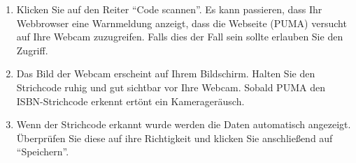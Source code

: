 \documentclass[b5paper,11pt,twoside]{scrbook} %
\begin{document}
\begin{enumerate}
\begin{itemize}
        \begin{enumerate}
            \item Klicken Sie auf den Reiter \enquote{Code scannen}. Es kann passieren, dass Ihr Webbrowser eine Warnmeldung anzeigt, dass die Webseite (PUMA) versucht auf Ihre Webcam zuzugreifen. Falls dies der Fall sein sollte erlauben Sie den Zugriff.
            \item Das Bild der Webcam erscheint auf Ihrem Bildschirm. Halten Sie den Strichcode ruhig und gut sichtbar vor Ihre Webcam. Sobald PUMA den ISBN-Strichcode erkennt ertönt ein Kamerageräusch.
            \item Wenn der Strichcode erkannt wurde werden die Daten automatisch angezeigt. Überprüfen Sie diese auf ihre Richtigkeit und klicken Sie anschließend auf \enquote{Speichern}.
        \end{enumerate}
    \end{itemize}
\end{enumerate}
\end{document}
